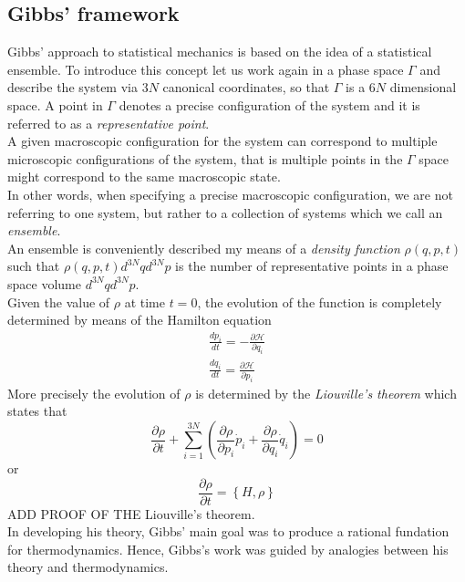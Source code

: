 \subsection*{Gibbs' framework}
Gibbs' approach to statistical mechanics is based on the idea of a statistical ensemble. To introduce this concept
let us work again in a phase space $\Gamma$ and describe the system via $3N$ canonical coordinates, so that $\Gamma$ is a $6N$ dimensional space. A point in $\Gamma$ denotes
a precise configuration of the system and it is referred to as a \emph{representative point}. \\
A given macroscopic configuration for the system can correspond to multiple microscopic configurations of the system, that is multiple points in the $\Gamma$ space might correspond to the same macroscopic state. \\
In other words, when specifying a precise macroscopic configuration, we are not referring to one system, but rather to a collection of systems which we call an \emph{ensemble}. \\
An ensemble is conveniently described my means of a \emph{density function} $\rho(q, p ,t)$ such that $\rho(q, p, t) d^{3N}qd^{3N}p$ is the number of representative points in a phase space volume $d^{3N}qd^{3N}p$. \\
Given the value of $\rho$ at time $t=0$, the evolution of the function is completely determined by means of the Hamilton equation 
\begin{gather*}
    \frac{dp_i}{dt} = -\frac{\partial \mathcal H}{\partial q_i} \\
    \frac{dq_i}{dt} = \frac{\partial \mathcal H}{\partial p_i}
\end{gather*}
More precisely the evolution of $\rho$ is determined by the \emph{Liouville's theorem} which states that
\begin{equation}
    \frac{\partial \rho}{\partial t} + \sum_{i=1}^{3N} \left(\frac{\partial \rho}{\partial p_i}\dot p_i + \frac{\partial \rho}{\partial q_i} \dot q_i\right) = 0
\end{equation}
or 
\begin{equation*}
    \frac{\partial \rho}{\partial t} = \left\{H, \rho\right\}
\end{equation*}
ADD PROOF OF THE Liouville's theorem. \\
\vspace{10pt}
In developing his theory, Gibbs' main goal was to produce a rational fundation for thermodynamics. Hence, Gibbs's work was guided by analogies between his theory and thermodynamics. \\
